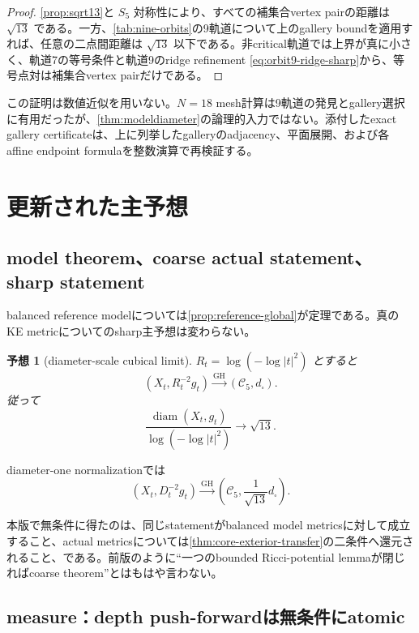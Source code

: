 \documentclass[11pt,a4paper]{ltjsarticle}
\newtheorem{conjecture}[theorem]{予想}
\theoremstyle{definition}
\theoremstyle{remark}
\newcommand{\diam}{\operatorname{diam}}
\newcommand{\GH}{\mathrm{GH}}
\begin{document}
\begin{proof}
\cref{prop:sqrt13}と $S_5$ 対称性により、すべての補集合vertex pairの距離は $\sqrt{13}$ である。一方、\cref{tab:nine-orbits}の9軌道について上のgallery boundを適用すれば、任意の二点間距離は $\sqrt{13}$ 以下である。非critical軌道では上界が真に小さく、軌道7の等号条件と軌道9のridge refinement \eqref{eq:orbit9-ridge-sharp}から、等号点対は補集合vertex pairだけである。
\end{proof}

この証明は数値近似を用いない。$N=18$ mesh計算は9軌道の発見とgallery選択に有用だったが、\cref{thm:modeldiameter}の論理的入力ではない。添付したexact gallery certificateは、上に列挙したgalleryのadjacency、平面展開、および各affine endpoint formulaを整数演算で再検証する。


\section{更新された主予想}

\subsection{model theorem、coarse actual statement、sharp statement}

balanced reference modelについては\cref{prop:reference-global}が定理である。真のKE metricについてのsharp主予想は変わらない。

\begin{conjecture}[diameter-scale cubical limit]\label{conj:main}
$R_t=\log(-\log|t|^2)$ とすると
\begin{equation}\label{eq:mainconj}
 (X_t,R_t^{-2}g_t)\xrightarrow{\GH}(\mathcal C_5,d_\square).
\end{equation}
従って
\begin{equation}\label{eq:diamconj}
 \frac{\diam(X_t,g_t)}{\log(-\log|t|^2)}\longrightarrow\sqrt{13}.
\end{equation}
\end{conjecture}

diameter-one normalizationでは
\[
 (X_t,D_t^{-2}g_t)
 \xrightarrow{\GH}
 \left(\mathcal C_5,\frac1{\sqrt{13}}d_\square\right).
\]

本版で無条件に得たのは、同じstatementがbalanced model metricsに対して成立すること、actual metricsについては\cref{thm:core-exterior-transfer}の二条件へ還元されること、である。前版のように``一つのbounded Ricci-potential lemmaが閉じればcoarse theorem''とはもはや言わない。

\subsection{measure：depth push-forwardは無条件にatomic}
\end{document}

